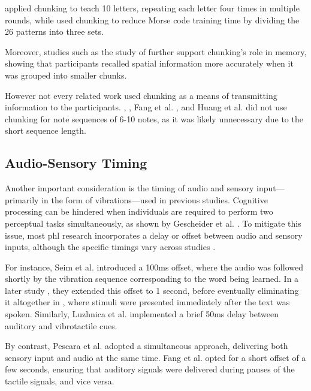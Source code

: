  applied chunking to teach 10 letters, repeating each letter four times in multiple rounds, while  used chunking to reduce Morse code training time by dividing the 26 patterns into three sets.

Moreover, studies such as the study of  further support chunking’s role in memory, showing that participants recalled spatial information more accurately when it was grouped into smaller chunks.

However not every related work used chunking as a means of transmitting information to the participants. , , Fang et al. \cite{Fang2023a, Fang2023}, and Huang et al. \cite{Huang2008} did not use chunking for note sequences of 6-10 notes, as it was likely unnecessary due to the short sequence length.

\subsection*{Audio-Sensory Timing}
Another important consideration is the timing of audio and sensory input—primarily in the form of vibrations—used in previous studies. Cognitive processing can be hindered when individuals are required to perform two perceptual tasks simultaneously, as shown by Gescheider et al. \cite{Gescheider1975}. To mitigate this issue, most \gls{phl} research incorporates a delay or offset between audio and sensory inputs, although the specific timings vary across studies \cite{Seim2014, Seim2017, Luzhnica2018, Fang2023a}.

For instance, Seim et al. \cite{Seim2014} introduced a 100ms offset, where the audio was followed shortly by the vibration sequence corresponding to the word being learned. In a later study \cite{Seim2016}, they extended this offset to 1 second, before eventually eliminating it altogether in \cite{Seim2017}, where stimuli were presented immediately after the text was spoken. Similarly, Luzhnica et al. \cite{Luzhnica2018} implemented a brief 50ms delay between auditory and vibrotactile cues.

By contrast, Pescara et al. \cite{Pescara2019} adopted a simultaneous approach, delivering both sensory input and audio at the same time. Fang et al. \cite{Fang2023a} opted for a short offset of a few seconds, ensuring that auditory signals were delivered during pauses of the tactile signals, and vice versa.

